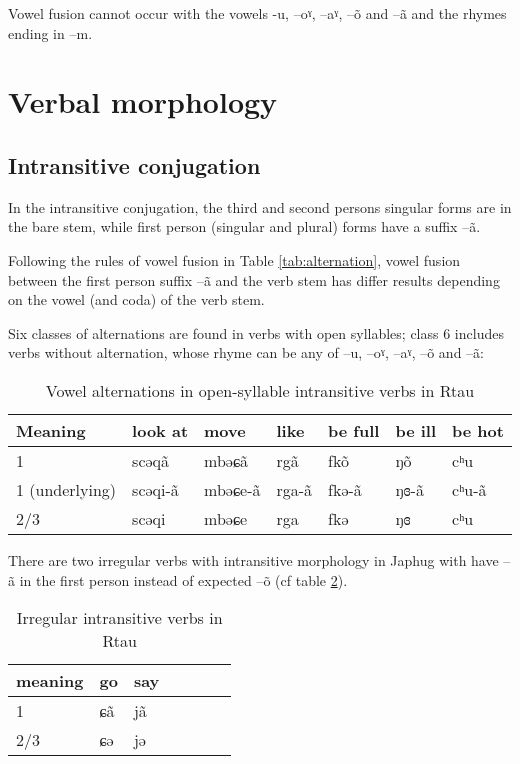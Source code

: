 \documentclass[oneside,a4paper,11pt]{article}
\newcommand{\ipa}[1]{{\phon #1}} %
\begin{document}
Vowel fusion cannot occur with the vowels -\ipa{u}, --\ipa{oˠ}, --\ipa{aˠ}, --\ipa{õ} and --\ipa{ã} and the rhymes ending in \ipa{--m}.
 
\section{Verbal morphology}


\subsection{Intransitive conjugation}
In the intransitive conjugation, the third and second persons singular forms are in the bare stem, while first person (singular and plural) forms have a suffix \ipa{--ã}.

Following the rules of  vowel fusion in Table \ref{tab:alternation}, vowel fusion between the first person suffix \ipa{--ã} and the verb stem has differ results depending on the vowel (and coda) of the verb stem. 
 
Six classes of alternations are found in verbs with open syllables; class 6 includes verbs without alternation, whose rhyme can be any of --\ipa{u}, --\ipa{oˠ}, --\ipa{aˠ}, --\ipa{õ} and --\ipa{ã}:
\begin{table}[H]
\caption{Vowel alternations in open-syllable intransitive verbs in Rtau} \label{tab:open.intr} \centering
\begin{tabular}{llll|ll|l}
\toprule
Meaning &	look at   &  	move   &  	like&  	be full     &  	 	be ill      &  	be hot       \\  
\midrule
1&	\ipa{scəqã} & 	\ipa{mbəɕã} & \ipa{rgã} &	\ipa{fkõ} & 	  	\ipa{ŋõ} & 	   	\ipa{cʰu}   \\ 
1 (underlying)&	\ipa{scəqi-ã} & 	\ipa{mbəɕe-ã} & \ipa{rga-ã} &	\ipa{fkə-ã} & 	  	\ipa{ŋɞ-ã} & 	   	\ipa{cʰu-ã}   \\ 
2/3&	\ipa{scəqi} & 	\ipa{mbəɕe} & \ipa{rga} & 	\ipa{fkə} & 	  	\ipa{ŋɞ} & 	 	\ipa{cʰu}  \\ 
\bottomrule
\end{tabular}
\end{table}


There are two irregular verbs with intransitive morphology in Japhug with have \ipa{--ã} in the first person instead of expected \ipa{--õ} (cf table \ref{tab:irr.intr}). 

\begin{table}[H]
\caption{Irregular intransitive verbs in Rtau} \label{tab:irr.intr} \centering
\begin{tabular}{llll|ll|l}
\toprule
meaning &	go     & say \\  
\midrule
1&	\ipa{ɕã}  	 &\ipa{jã}\\ 
2/3&	\ipa{ɕə} & 	\ipa{jə} &\\ 
\bottomrule
\end{tabular}
\end{table}
\end{document}
